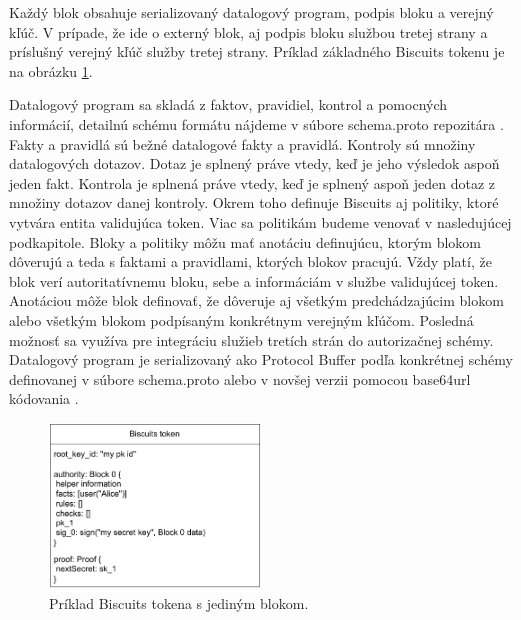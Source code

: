 Každý blok obsahuje serializovaný datalogový program, podpis bloku a verejný kľúč. V prípade, že ide o externý blok, aj podpis bloku službou tretej strany a príslušný verejný kľúč služby tretej strany. Príklad základného Biscuits tokenu je na obrázku \ref{fig:biscuits_token}.

Datalogový program sa skladá z faktov, pravidiel, kontrol a pomocných informácií, detailnú schému formátu nájdeme v súbore schema.proto repozitára \cite{biscuits_git}. Fakty a pravidlá sú bežné datalogové fakty a pravidlá. Kontroly sú množiny datalogových dotazov. Dotaz je splnený práve vtedy, keď je jeho výsledok aspoň jeden fakt. Kontrola je splnená práve vtedy, keď je splnený aspoň jeden dotaz z množiny dotazov danej kontroly. Okrem toho definuje Biscuits aj politiky, ktoré vytvára entita validujúca token. Viac sa politikám budeme venovať v nasledujúcej podkapitole. Bloky a politiky môžu mať anotáciu definujúcu, ktorým blokom dôverujú a teda s faktami a pravidlami, ktorých blokov pracujú. Vždy platí, že blok verí autoritatívnemu bloku, sebe a informáciám v službe validujúcej token. Anotáciou môže blok definovať, že dôveruje aj všetkým predchádzajúcim blokom alebo všetkým blokom podpísaným konkrétnym verejným kľúčom. Posledná možnosť sa využíva pre integráciu služieb tretích strán do autorizačnej schémy.
Datalogový program je serializovaný ako Protocol Buffer \cite{protobuf} podľa konkrétnej schémy definovanej v súbore schema.proto alebo v novšej verzii pomocou base64url kódovania \cite{base64_rfc}.

\begin{figure}
    \centerline{\includegraphics[width=0.5\textwidth]{images/biscuits_token2}}
    \caption[Biscuits token]{Príklad Biscuits tokena s jediným blokom.}
    \label{fig:biscuits_token}
\end{figure}


